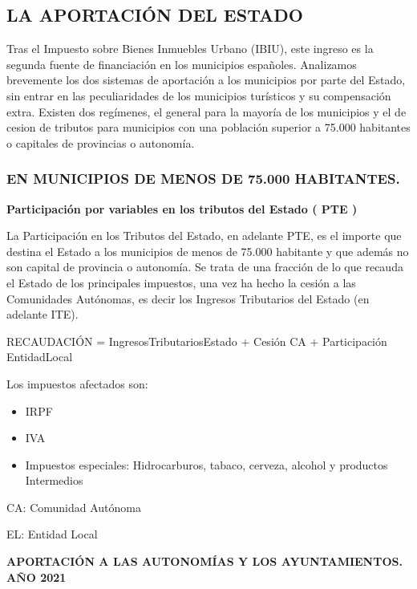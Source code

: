 \documentclass[
]{article}
\providecommand{\tightlist}{%
  \setlength{\itemsep}{0pt}\setlength{\parskip}{0pt}}
\begin{document}
\hypertarget{la-aportaciuxf3n-del-estado}{%
\subsection{LA APORTACIÓN DEL
ESTADO}\label{la-aportaciuxf3n-del-estado}}

Tras el Impuesto sobre Bienes Inmuebles Urbano (IBIU), este ingreso es
la segunda fuente de financiación en los municipios españoles.
Analizamos brevemente los dos sistemas de aportación a los municipios
por parte del Estado, sin entrar en las peculiaridades de los municipios
turísticos y su compensación extra. Existen dos regímenes, el general
para la mayoría de los municipios y el de cesion de tributos para
municipios con una población superior a 75.000 habitantes o capitales de
provincias o autonomía.

\hypertarget{en-municipios-de-menos-de-75.000-habitantes.}{%
\subsubsection{EN MUNICIPIOS DE MENOS DE 75.000
HABITANTES.}\label{en-municipios-de-menos-de-75.000-habitantes.}}

\textbf{Participación por variables en los tributos del Estado ( PTE )}

La Participación en los Tributos del Estado, en adelante PTE, es el
importe que destina el Estado a los municipios de menos de 75.000
habitante y que además no son capital de provincia o autonomía. Se trata
de una fracción de lo que recauda el Estado de los principales
impuestos, una vez ha hecho la cesión a las Comunidades Autónomas, es
decir los Ingresos Tributarios del Estado (en adelante ITE).

RECAUDACIÓN = IngresosTributariosEstado + Cesión CA + Participación
EntidadLocal

Los impuestos afectados son:

\begin{itemize}
\tightlist
\item
  IRPF
\item
  IVA
\item
  Impuestos especiales: Hidrocarburos, tabaco, cerveza, alcohol y
  productos Intermedios
\end{itemize}

CA: Comunidad Autónoma

EL: Entidad Local

\textbf{APORTACIÓN A LAS AUTONOMÍAS Y LOS AYUNTAMIENTOS. AÑO 2021}
\end{document}
